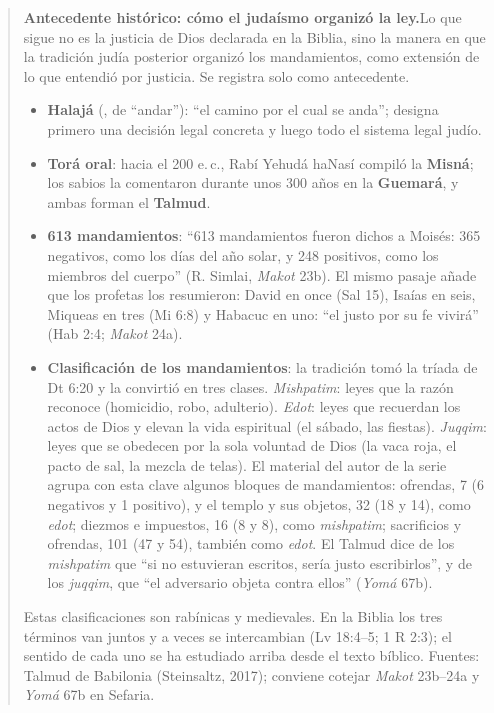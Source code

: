 \begin{quote}\small\textbf{\color{azulp}Antecedente histórico: cómo el judaísmo organizó la ley.}\enspace Lo que sigue no es la justicia de Dios declarada en la Biblia, sino la manera en que la tradición judía posterior organizó los mandamientos, como extensión de lo que entendió por justicia. Se registra solo como antecedente.
\begin{itemize}\setlength{\itemsep}{1pt}
\item \textbf{Halajá} (, de  ``andar''): ``el camino por el cual se anda''; designa primero una decisión legal concreta y luego todo el sistema legal judío.
\item \textbf{Torá oral}: hacia el 200 e.\,c., Rabí Yehudá haNasí compiló la \textbf{Misná}; los sabios la comentaron durante unos 300 años en la \textbf{Guemará}, y ambas forman el \textbf{Talmud}.
\item \textbf{613 mandamientos}: ``613 mandamientos fueron dichos a Moisés: 365 negativos, como los días del año solar, y 248 positivos, como los miembros del cuerpo'' (R. Simlai, \emph{Makot} 23b). El mismo pasaje añade que los profetas los resumieron: David en once (Sal 15), Isaías en seis, Miqueas en tres (Mi 6:8) y Habacuc en uno: ``el justo por su fe vivirá'' (Hab 2:4; \emph{Makot} 24a).
\item \textbf{Clasificación de los mandamientos}: la tradición tomó la tríada de Dt 6:20 y la convirtió en tres clases. \emph{Mishpatim}: leyes que la razón reconoce (homicidio, robo, adulterio). \emph{Edot}: leyes que recuerdan los actos de Dios y elevan la vida espiritual (el sábado, las fiestas). \emph{Juqqim}: leyes que se obedecen por la sola voluntad de Dios (la vaca roja, el pacto de sal, la mezcla de telas). El material del autor de la serie agrupa con esta clave algunos bloques de mandamientos: ofrendas, 7 (6 negativos y 1 positivo), y el templo y sus objetos, 32 (18 y 14), como \emph{edot}; diezmos e impuestos, 16 (8 y 8), como \emph{mishpatim}; sacrificios y ofrendas, 101 (47 y 54), también como \emph{edot}. El Talmud dice de los \emph{mishpatim} que ``si no estuvieran escritos, sería justo escribirlos'', y de los \emph{juqqim}, que ``el adversario objeta contra ellos'' (\emph{Yomá} 67b).
\end{itemize}
Estas clasificaciones son rabínicas y medievales. En la Biblia los tres términos van juntos y a veces se intercambian (Lv 18:4--5; 1 R 2:3); el sentido de cada uno se ha estudiado arriba desde el texto bíblico. Fuentes: Talmud de Babilonia (Steinsaltz, 2017); conviene cotejar \emph{Makot} 23b--24a y \emph{Yomá} 67b en Sefaria.
\end{quote}

